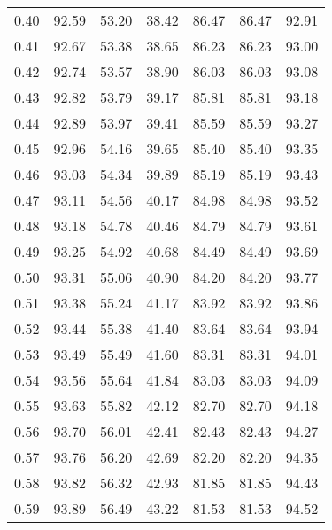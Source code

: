 \begin{tabular}{|c|c|c|c|c|c|c|}
      0.40 &     92.59 &     53.20 &      38.42 &   86.47 &      86.47 &         92.91 \\
      0.41 &     92.67 &     53.38 &      38.65 &   86.23 &      86.23 &         93.00 \\
      0.42 &     92.74 &     53.57 &      38.90 &   86.03 &      86.03 &         93.08 \\
      0.43 &     92.82 &     53.79 &      39.17 &   85.81 &      85.81 &         93.18 \\
      0.44 &     92.89 &     53.97 &      39.41 &   85.59 &      85.59 &         93.27 \\
      0.45 &     92.96 &     54.16 &      39.65 &   85.40 &      85.40 &         93.35 \\
      0.46 &     93.03 &     54.34 &      39.89 &   85.19 &      85.19 &         93.43 \\
      0.47 &     93.11 &     54.56 &      40.17 &   84.98 &      84.98 &         93.52 \\
      0.48 &     93.18 &     54.78 &      40.46 &   84.79 &      84.79 &         93.61 \\
      0.49 &     93.25 &     54.92 &      40.68 &   84.49 &      84.49 &         93.69 \\
      0.50 &     93.31 &     55.06 &      40.90 &   84.20 &      84.20 &         93.77 \\
      0.51 &     93.38 &     55.24 &      41.17 &   83.92 &      83.92 &         93.86 \\
      0.52 &     93.44 &     55.38 &      41.40 &   83.64 &      83.64 &         93.94 \\
      0.53 &     93.49 &     55.49 &      41.60 &   83.31 &      83.31 &         94.01 \\
      0.54 &     93.56 &     55.64 &      41.84 &   83.03 &      83.03 &         94.09 \\
      0.55 &     93.63 &     55.82 &      42.12 &   82.70 &      82.70 &         94.18 \\
      0.56 &     93.70 &     56.01 &      42.41 &   82.43 &      82.43 &         94.27 \\
      0.57 &     93.76 &     56.20 &      42.69 &   82.20 &      82.20 &         94.35 \\
      0.58 &     93.82 &     56.32 &      42.93 &   81.85 &      81.85 &         94.43 \\
      0.59 &     93.89 &     56.49 &      43.22 &   81.53 &      81.53 &         94.52 \\

\end{tabular}
